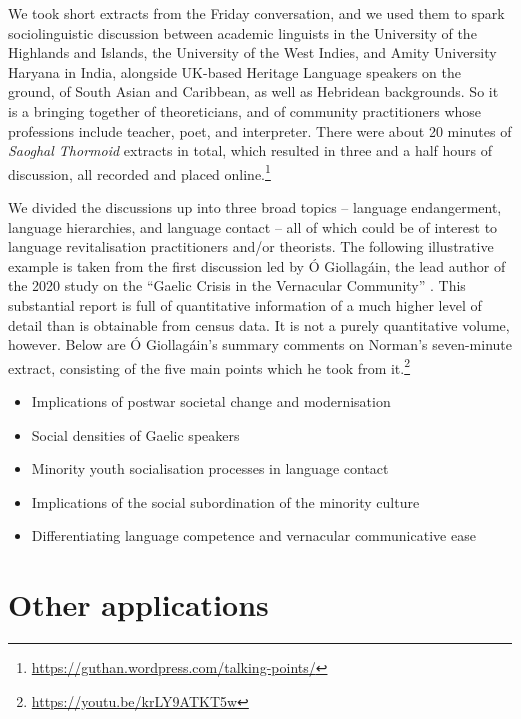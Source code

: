 \documentclass[output=paper,colorlinks,citecolor=brown]{langscibook}
\begin{document}
We took short extracts from the Friday conversation, and we used them to spark sociolinguistic discussion between academic linguists in the University of the Highlands and Islands, the University of the West Indies, and Amity University Haryana in India, alongside UK-based Heritage Language speakers on the ground, of South Asian and Caribbean, as well as Hebridean backgrounds. So it is a bringing together of theoreticians, and of community practitioners whose professions include teacher, poet, and interpreter. There were about 20 minutes of \textit{Saoghal Thormoid} extracts in total, which resulted in three and a half hours of discussion, all recorded and placed online.\footnote{\url{https://guthan.wordpress.com/talking-points/}} 

We divided the discussions up into three broad topics – language endangerment, language hierarchies, and language contact – all of which could be of interest to language revitalisation practitioners and/or theorists. The following illustrative example is taken from the first discussion led by Ó Giollagáin, the lead author of the 2020 study on the ``Gaelic Crisis in the Vernacular Community” \citep{gw:ÓGiollagáin2020}. This substantial report is full of quantitative information of a much higher level of detail than is obtainable from census data. It is not a purely quantitative volume, however. Below are Ó Giollagáin’s summary comments on Norman’s seven-minute extract, consisting of the five main points which he took from it.\footnote{\url{https://youtu.be/krLY9ATKT5w}} 

\begin{itemize}
    \item Implications of postwar societal change and modernisation
    \item Social densities of Gaelic speakers
    \item Minority youth socialisation processes in language contact
    \item Implications of the social subordination of the minority culture
    \item Differentiating language competence and vernacular communicative ease
\end{itemize}


\section{Other applications}
\end{document}

